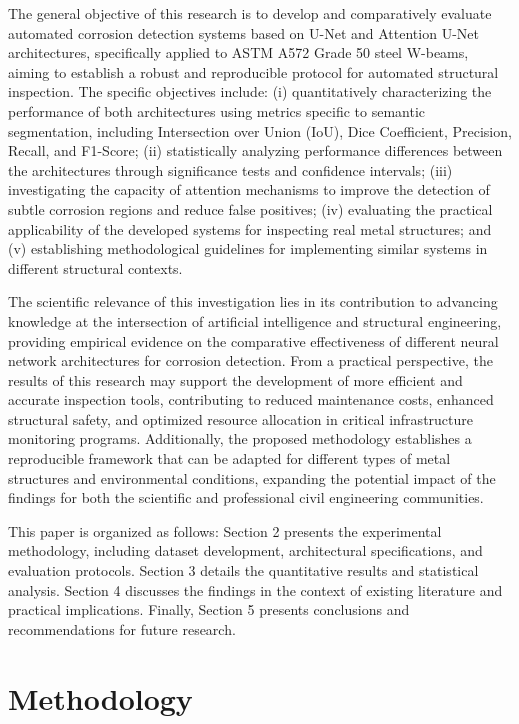 \documentclass[Journal,letterpaper]{ascelike-new}
\begin{document}
The general objective of this research is to develop and comparatively evaluate automated corrosion detection systems based on U-Net and Attention U-Net architectures, specifically applied to ASTM A572 Grade 50 steel W-beams, aiming to establish a robust and reproducible protocol for automated structural inspection. The specific objectives include: (i) quantitatively characterizing the performance of both architectures using metrics specific to semantic segmentation, including Intersection over Union (IoU), Dice Coefficient, Precision, Recall, and F1-Score; (ii) statistically analyzing performance differences between the architectures through significance tests and confidence intervals; (iii) investigating the capacity of attention mechanisms to improve the detection of subtle corrosion regions and reduce false positives; (iv) evaluating the practical applicability of the developed systems for inspecting real metal structures; and (v) establishing methodological guidelines for implementing similar systems in different structural contexts.

The scientific relevance of this investigation lies in its contribution to advancing knowledge at the intersection of artificial intelligence and structural engineering, providing empirical evidence on the comparative effectiveness of different neural network architectures for corrosion detection. From a practical perspective, the results of this research may support the development of more efficient and accurate inspection tools, contributing to reduced maintenance costs, enhanced structural safety, and optimized resource allocation in critical infrastructure monitoring programs. Additionally, the proposed methodology establishes a reproducible framework that can be adapted for different types of metal structures and environmental conditions, expanding the potential impact of the findings for both the scientific and professional civil engineering communities.

This paper is organized as follows: Section 2 presents the experimental methodology, including dataset development, architectural specifications, and evaluation protocols. Section 3 details the quantitative results and statistical analysis. Section 4 discusses the findings in the context of existing literature and practical implications. Finally, Section 5 presents conclusions and recommendations for future research.

\section{Methodology}
\label{sec:methodology}
\end{document}
